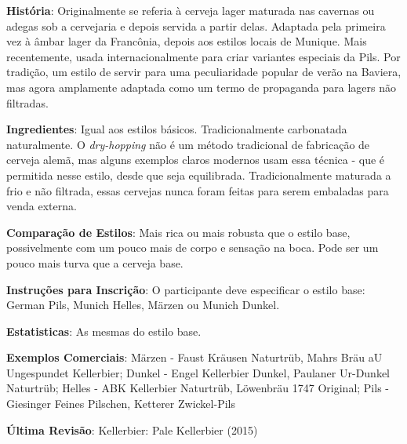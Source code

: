\textbf{História}: Originalmente se referia à cerveja lager maturada nas cavernas ou adegas sob a cervejaria e depois servida a partir delas. Adaptada pela primeira vez à âmbar lager da Francônia, depois aos estilos locais de Munique. Mais recentemente, usada internacionalmente para criar variantes especiais da Pils. Por tradição, um estilo de servir para uma peculiaridade popular de verão na Baviera, mas agora amplamente adaptada como um termo de propaganda para lagers não filtradas.

\textbf{Ingredientes}: Igual aos estilos básicos. Tradicionalmente carbonatada naturalmente. O \textit{dry-hopping} não é um método tradicional de fabricação de cerveja alemã, mas alguns exemplos claros modernos usam essa técnica - que é permitida nesse estilo, desde que seja equilibrada. Tradicionalmente maturada a frio e não filtrada, essas cervejas nunca foram feitas para serem embaladas para venda externa.

\textbf{Comparação de Estilos}: Mais rica ou mais robusta que o estilo base, possivelmente com um pouco mais de corpo e sensação na boca. Pode ser um pouco mais turva que a cerveja base.

\textbf{Instruções para Inscrição}: O participante deve especificar o estilo base: German Pils, Munich Helles, Märzen ou Munich Dunkel.

\textbf{Estatisticas}: As mesmas do estilo base.

\textbf{Exemplos Comerciais}: Märzen - Faust Kräusen Naturtrüb, Mahrs Bräu aU Ungespundet Kellerbier; Dunkel - Engel Kellerbier Dunkel, Paulaner Ur-Dunkel Naturtrüb; Helles - ABK Kellerbier Naturtrüb, Löwenbräu 1747 Original; Pils - Giesinger Feines Pilschen, Ketterer Zwickel-Pils

\textbf{Última Revisão}: Kellerbier: Pale Kellerbier (2015)

